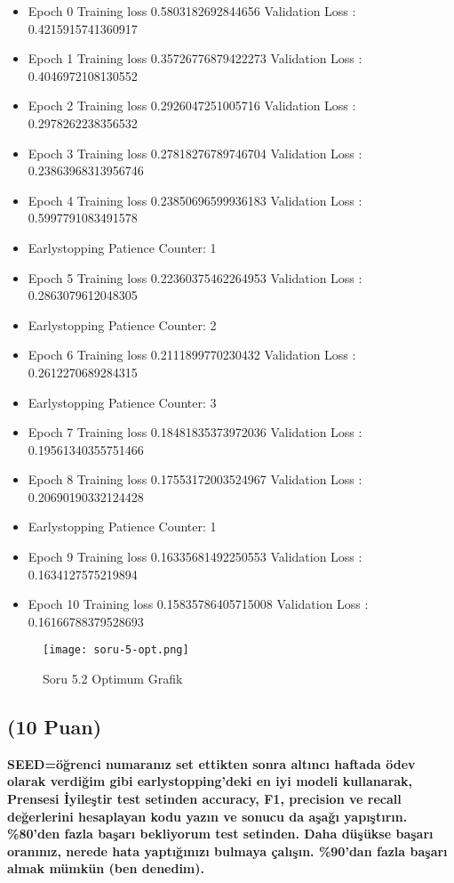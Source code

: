 \documentclass[11pt]{article}
\begin{document}
\begin{itemize}
	
\item	Epoch 0 Training loss 0.5803182692844656 Validation Loss : 0.4215915741360917
\item	Epoch 1 Training loss 0.35726776879422273 Validation Loss : 0.4046972108130552
\item	Epoch 2 Training loss 0.2926047251005716 Validation Loss : 0.2978262238356532
\item	Epoch 3 Training loss 0.27818276789746704 Validation Loss : 0.23863968313956746
\item	Epoch 4 Training loss 0.23850696599936183 Validation Loss : 0.5997791083491578
\item	Earlystopping Patience Counter: 1
\item	Epoch 5 Training loss 0.22360375462264953 Validation Loss : 0.2863079612048305
\item	Earlystopping Patience Counter: 2
\item	Epoch 6 Training loss 0.2111899770230432 Validation Loss : 0.2612270689284315
\item	Earlystopping Patience Counter: 3
\item	Epoch 7 Training loss 0.18481835373972036 Validation Loss : 0.19561340355751466
\item	Epoch 8 Training loss 0.17553172003524967 Validation Loss : 0.20690190332124428
\item	Earlystopping Patience Counter: 1
\item	Epoch 9 Training loss 0.16335681492250553 Validation Loss : 0.1634127575219894
\item	Epoch 10 Training loss 0.15835786405715008 Validation Loss : 0.16166788379528693
	
\end{itemize}


\begin{figure}[ht!]
    \centering
    \texttt{[image: soru-5-opt.png]}
    \caption{Soru 5.2 Optimum Grafik}
    \label{fig:my_pic}
\end{figure}


\subsection{(10 Puan)} \textbf{SEED=öğrenci numaranız set ettikten sonra altıncı haftada ödev olarak verdiğim gibi earlystopping'deki en iyi modeli kullanarak, Prensesi İyileştir test setinden accuracy, F1, precision ve recall değerlerini hesaplayan kodu yazın ve sonucu da aşağı yapıştırın. \%80'den fazla başarı bekliyorum test setinden. Daha düşükse başarı oranınız, nerede hata yaptığınızı bulmaya çalışın. \%90'dan fazla başarı almak mümkün (ben denedim).}
\end{document}
